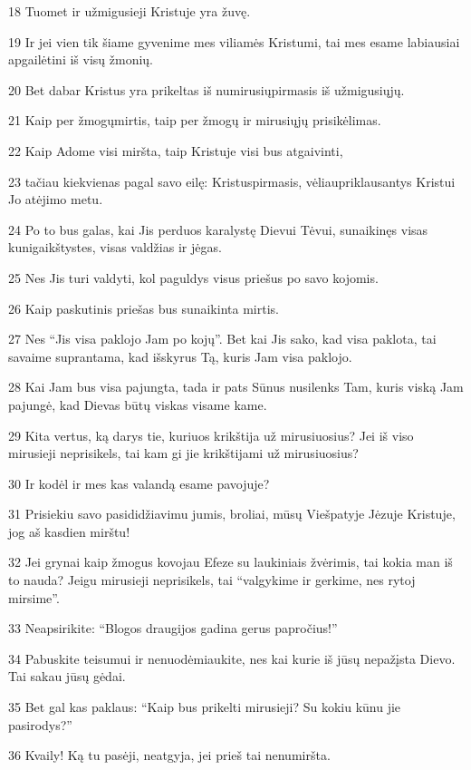 \par 18 Tuomet ir užmigusieji Kristuje yra žuvę. 
\par 19 Ir jei vien tik šiame gyvenime mes viliamės Kristumi, tai mes esame labiausiai apgailėtini iš visų žmonių. 
\par 20 Bet dabar Kristus yra prikeltas iš numirusių­pirmasis iš užmigusiųjų. 
\par 21 Kaip per žmogų­mirtis, taip per žmogų ir mirusiųjų prisikėlimas. 
\par 22 Kaip Adome visi miršta, taip Kristuje visi bus atgaivinti, 
\par 23 tačiau kiekvienas pagal savo eilę: Kristus­pirmasis, vėliau­priklausantys Kristui Jo atėjimo metu. 
\par 24 Po to bus galas, kai Jis perduos karalystę Dievui Tėvui, sunaikinęs visas kunigaikštystes, visas valdžias ir jėgas. 
\par 25 Nes Jis turi valdyti, kol paguldys visus priešus po savo kojomis. 
\par 26 Kaip paskutinis priešas bus sunaikinta mirtis. 
\par 27 Nes “Jis visa paklojo Jam po kojų”. Bet kai Jis sako, kad visa paklota, tai savaime suprantama, kad išskyrus Tą, kuris Jam visa paklojo. 
\par 28 Kai Jam bus visa pajungta, tada ir pats Sūnus nusilenks Tam, kuris viską Jam pajungė, kad Dievas būtų viskas visame kame. 
\par 29 Kita vertus, ką darys tie, kuriuos krikštija už mirusiuosius? Jei iš viso mirusieji neprisikels, tai kam gi jie krikštijami už mirusiuosius? 
\par 30 Ir kodėl ir mes kas valandą esame pavojuje? 
\par 31 Prisiekiu savo pasididžiavimu­ jumis, broliai, mūsų Viešpatyje Jėzuje Kristuje, jog aš kasdien mirštu! 
\par 32 Jei grynai kaip žmogus kovojau Efeze su laukiniais žvėrimis, tai kokia man iš to nauda? Jeigu mirusieji neprisikels, tai “valgykime ir gerkime, nes rytoj mirsime”. 
\par 33 Neapsirikite: “Blogos draugijos gadina gerus papročius!” 
\par 34 Pabuskite teisumui ir nenuodėmiaukite, nes kai kurie iš jūsų nepažįsta Dievo. Tai sakau jūsų gėdai. 
\par 35 Bet gal kas paklaus: “Kaip bus prikelti mirusieji? Su kokiu kūnu jie pasirodys?” 
\par 36 Kvaily! Ką tu pasėji, neatgyja, jei prieš tai nenumiršta. 
